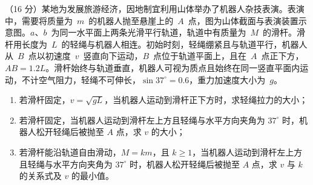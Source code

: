 \begin{question}
（16 分）某地为发展旅游经济，因地制宜利用山体举办了机器人杂技表演。表演中，需要将质量为~$m$~的机器人抛至悬崖上的~$A$~点，图为山体截面与表演装置示意图。$a$、$b$~为同一水平面上两条光滑平行轨道，轨道中有质量为~$M$~的滑杆。滑杆用长度为~$L$~的轻绳与机器人相连。初始时刻，轻绳绷紧且与轨道平行，机器人从~$B$~点以初速度~$v$~竖直向下运动，$B$~点位于轨道平面上，且在~$A$~点正下方，$AB=1.2L$。滑杆始终与轨道垂直，机器人可视为质点且始终在同一竖直平面内运动，不计空气阻力，轻绳不可伸长，$\sin 37^{\circ}=0.6$，重力加速度大小为~$g$。


\begin{enumerate}[leftmargin=2em, label=(\arabic*)]
  \item 若滑杆固定，$v=\sqrt{gL}$，当机器人运动到滑杆正下方时，求轻绳拉力的大小；
  \item 若滑杆固定，当机器人运动到滑杆左上方且轻绳与水平方向夹角为 $37^{\circ}$ 时，机器人松开轻绳后被抛至 $A$ 点，求 $v$ 的大小；
  \item 若滑杆能沿轨道自由滑动，$M=km$，且 $k\ge 1$，当机器人运动到滑杆左上方且轻绳与水平方向夹角为 $37^{\circ}$ 时，机器人松开轻绳后被抛至 $A$ 点，求 $v$ 与 $k$ 的关系式及 $v$ 的最小值。
\end{enumerate}
\end{question}
